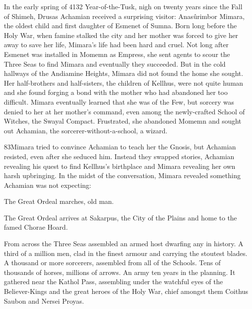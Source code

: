\documentclass[]{book}
\begin{document}
In the early spring of 4132 Year-of-the-Tusk, nigh on twenty years since the Fall of
Shimeh, Drusas Achamian received a surprising visitor: Anasûrimbor Mimara, the
oldest child and first daughter of Esmenet of Sumna. Born long before the Holy War,
when famine stalked the city and her mother was forced to give her away to save her
life, Mimara's life had been hard and cruel. Not long after Esmenet was installed in
Momemn as Empress, she sent agents to scour the Three Seas to find Mimara and
eventually they succeeded. But in the cold hallways of the Andiamine Heights, Mimara
did not found the home she sought. Her half-brothers and half-sisters, the children of
Kellhus, were not quite human and she found forging a bond with the mother who had
abandoned her too difficult. Mimara eventually learned that she was of the Few, but
sorcery was denied to her at her mother's command, even among the newly-crafted
School of Witches, the Swayal Compact. Frustrated, she abandoned Momemn and
sought out Achamian, the sorcerer-without-a-school, a wizard.

83Mimara tried to convince Achamian to teach her the Gnosis, but Achamian resisted,
even after she seduced him. Instead they swapped stories, Achamian revealing his quest
to find Kellhus's birthplace and Mimara revealing her own harsh upbringing. In the
midst of the conversation, Mimara revealed something Achamian was not expecting:

The Great Ordeal marches, old man.

The Great Ordeal arrives at Sakarpus, the City of the Plains and home to the famed Chorae Hoard.

From across the Three Seas assembled an armed host dwarfing any in history. A third
of a million men, clad in the finest armour and carrying the stoutest blades. A
thousand or more sorcerers, assembled from all of the Schools. Tens of thousands of
horses, millions of arrows. An army ten years in the planning. It gathered near the
Kathol Pass, assembling under the watchful eyes of the Believer-Kings and the great
heroes of the Holy War, chief amongst them Coithus Saubon and Nersei Proyas.
\end{document}

